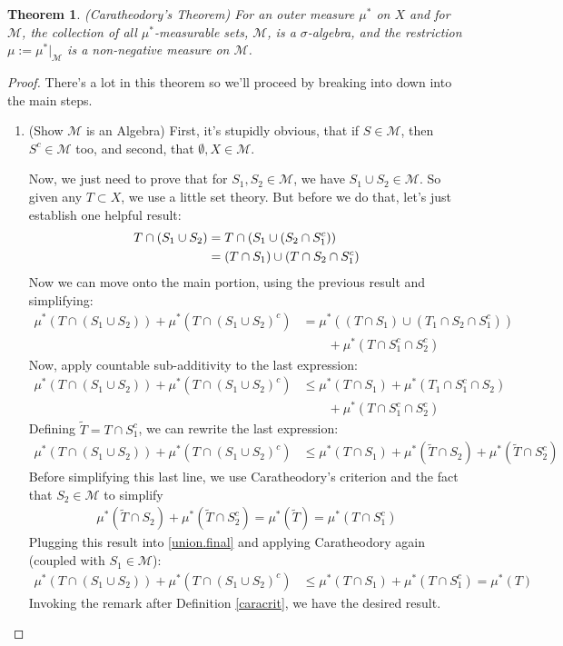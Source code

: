 \documentclass[12pt]{article}
\theoremstyle{plain}
\newtheorem{thm}{Theorem}[subsection]
\theoremstyle{definition}
\theoremstyle{remark}
\begin{document}
\begin{thm}
\emph{(Caratheodory's Theorem)} For an outer measure $\mu^*$ on $X$ and for $\mathscr{M}$, the collection of all $\mu^*$-measurable sets, $\mathscr{M}$, is a $\sigma$-algebra, and the restriction $\mu:=\mu^*|_\mathscr{M}$ is a non-negative measure on $\mathscr{M}$.
\end{thm}
\begin{proof}
There's a lot in this theorem so we'll proceed by breaking into down into the main steps.

\begin{enumerate}
\item (Show $\mathscr{M}$ is an Algebra) First, it's stupidly obvious, that if $S\in\mathscr{M}$, then $S^c\in\mathscr{M}$ too, and second, that $\emptyset, X\in\mathscr{M}$. 

Now, we just need to prove that for $S_1,S_2\in\mathscr{M}$, we have $S_1\cup S_2\in\mathscr{M}$. So given any $T\subset X$, we use a little set theory. But before we do that, let's just establish one helpful result:
\begin{align}
    \label{outmeasmod}
    T\cap (S_1\cup S_2) &=  
    T\cap (S_1\cup (S_2\cap S_1^c)) \notag \\
    &= (T\cap S_1)\cup (T\cap S_2\cap S_1^c) 
\end{align}
Now we can move onto the main portion, using the previous result and simplifying:
\begin{align*}
    \mu^*(T\cap(S_1\cup S_2)) +
    \mu^*(T\cap(S_1\cup S_2)^c) &=
    \mu^*((T\cap S_1)\cup (T_1 \cap S_2\cap S_1^c)) \\
    &\qquad+\mu^*(T\cap S_1^c\cap S_2^c) 
\end{align*}
Now, apply countable sub-additivity to the last expression:
\begin{align*}
    \mu^*(T\cap(S_1\cup S_2)) +
    \mu^*(T\cap(S_1\cup S_2)^c) 
    &\leq\mu^*(T\cap S_1) + \mu^*(T_1\cap S_1^c \cap S_2)\\
    &\qquad+\mu^*(T\cap S_1^c\cap S_2^c) 
\end{align*}
Defining $\tilde{T}=T\cap S_1^c$, we can rewrite the last expression:
\begin{align}
    \label{union.final}
    \mu^*(T\cap(S_1\cup S_2)) +
    \mu^*(T\cap(S_1\cup S_2)^c) 
    &\leq\mu^*(T\cap S_1) + \mu^*(\tilde{T} \cap S_2)
    +\mu^*(\tilde{T}\cap S_2^c) 
\end{align}
Before simplifying this last line, we use Caratheodory's criterion and the fact that $S_2\in\mathscr{M}$ to simplify 
\begin{align*}
    \mu^*(\tilde{T} \cap S_2)
    +\mu^*(\tilde{T}\cap S_2^c) =
    \mu^*(\tilde{T}) = \mu^*(T\cap S_1^c)
\end{align*}
Plugging this result into \ref{union.final} and applying Caratheodory again (coupled with $S_1\in\mathscr{M}$):
\begin{align*}
    \mu^*(T\cap(S_1\cup S_2)) +
    \mu^*(T\cap(S_1\cup S_2)^c) 
    &\leq\mu^*(T\cap S_1) 
    + \mu^*(T\cap S_1^c) 
    =\mu^*(T)
\end{align*}
Invoking the remark after Definition \ref{caracrit}, we have the desired result.


\end{enumerate}
\end{proof}
\end{document}

